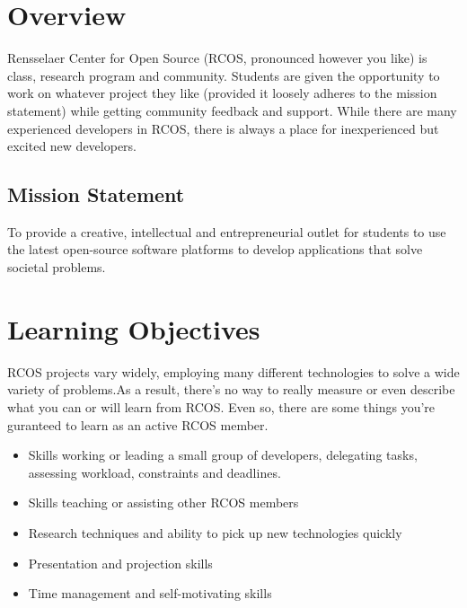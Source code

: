 \documentclass[12pt]{article}
\begin{document}
    \maketitle

    \tableofcontents

    \newpage

    \section{Overview}


    Rensselaer Center for Open Source (RCOS, pronounced however you like) is class, research program and community. Students are given the opportunity to work on whatever project they like (provided it loosely adheres to the mission statement) while getting community feedback and support. While there are many experienced developers in RCOS, there is always a place for inexperienced but excited new developers.
    \subsection{Mission Statement}
    To provide a creative, intellectual and entrepreneurial outlet for students to use the latest open-source software platforms to develop applications that solve societal problems.
    \section{Learning Objectives}

    RCOS projects vary widely, employing many different technologies to solve a wide variety of problems.As a result, there's no way to really measure or even describe what you can or will learn from RCOS. Even so, there are some things you're guranteed to learn as an active RCOS member.

    \begin{itemize}
        \item Skills working or leading a small group of developers, delegating tasks, assessing workload, constraints and deadlines.
        \item Skills teaching or assisting other RCOS members
        \item Research techniques and ability to pick up new technologies quickly
        \item Presentation and projection skills
        \item Time management and self-motivating skills
    \end{itemize}
\end{document}
